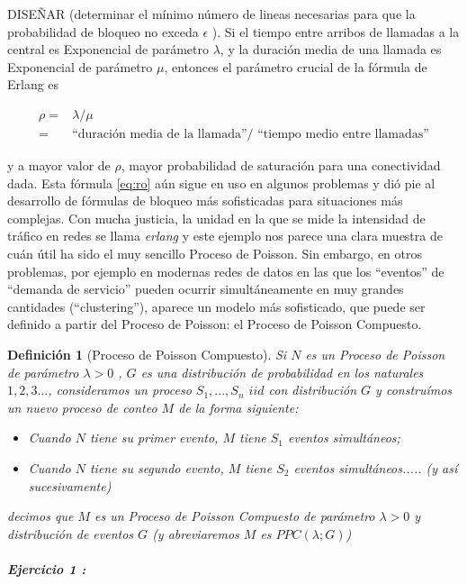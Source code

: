 \documentclass[
  oneside]{article}
\newtheorem{definition}{Definición}[section]
\begin{document}
DISEÑAR (determinar el mínimo número de lineas necesarias para que la
probabilidad de bloqueo no exceda \(\epsilon\) ). Si el tiempo entre
arribos de llamadas a la central es Exponencial de parámetro
\(\lambda\), y la duración media de una llamada es Exponencial de
parámetro \(\mu\), entonces el parámetro crucial de la fórmula de Erlang
es

\begin{align}
\rho=&\lambda/\mu  \nonumber \\
= &\text{“duración media de la llamada”/ “tiempo medio entre llamadas”}\label{eq:ro}
\end{align}

y a mayor valor de \(\rho\), mayor probabilidad de saturación para una
conectividad dada. Esta fórmula \eqref{eq:ro} aún sigue en uso en
algunos problemas y dió pie al desarrollo de fórmulas de bloqueo más
sofisticadas para situaciones más complejas. Con mucha justicia, la
unidad en la que se mide la intensidad de tráfico en redes se llama
\textit{erlang} y este ejemplo nos parece una clara muestra de cuán útil
ha sido el muy sencillo Proceso de Poisson. Sin embargo, en otros
problemas, por ejemplo en modernas redes de datos en las que los
``eventos'' de ``demanda de servicio'' pueden ocurrir simultáneamente en
muy grandes cantidades (``clustering''), aparece un modelo más
sofisticado, que puede ser definido a partir del Proceso de Poisson: el
Proceso de Poisson Compuesto.

\begin{definition}[Proceso de Poisson Compuesto]\label{def:2}
Si $N$ es un Proceso de Poisson de parámetro $\lambda>0$ , $G$ es una distribución de probabilidad en los naturales $1,2,3...$, consideramos un proceso $S_1,...,S_n$ $iid$ con distribución $G$ y construímos un nuevo proceso de conteo $M$ de la forma siguiente:
\begin{itemize}
\item Cuando $N$ tiene su primer evento, $M$ tiene $S_1$ eventos simultáneos;
\item Cuando $N$ tiene su segundo evento, $M$ tiene $S_2$ eventos simultáneos..... (y así sucesivamente)
\end{itemize}
decimos que $M$ es un Proceso de Poisson Compuesto de parámetro $\lambda>0$ y distribución de eventos $G$ (y abreviaremos $M$ es $PPC(\lambda;G)$)
\end{definition}

\hypertarget{ejercicio-1}{%
\subparagraph{Ejercicio 1 :}\label{ejercicio-1}}
\end{document}
